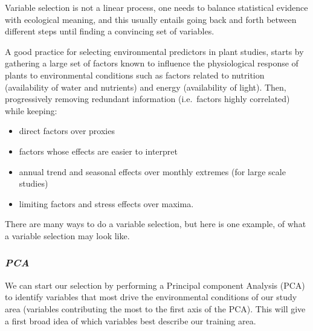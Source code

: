 \documentclass[
]{article}
\begin{document}
Variable selection is not a linear process, one needs to balance
statistical evidence with ecological meaning, and this usually entails
going back and forth between different steps until finding a convincing
set of variables.

\begin{infobox}

A good practice for selecting environmental predictors in plant studies,
starts by gathering a large set of factors known to influence the
physiological response of plants to environmental conditions such as
factors related to nutrition (availability of water and nutrients) and
energy (availability of light). Then, progressively removing redundant
information (i.e.~factors highly correlated) while keeping:

\begin{itemize}
\item
  direct factors over proxies
\item
  factors whose effects are easier to interpret
\item
  annual trend and seasonal effects over monthly extremes (for large
  scale studies)
\item
  limiting factors and stress effects over maxima.
\end{itemize}

\end{infobox}

There are many ways to do a variable selection, but here is one example,
of what a variable selection may look like.

\hypertarget{pca}{%
\subsubsection{\texorpdfstring{\emph{PCA}}{PCA}}\label{pca}}

We can start our selection by performing a Principal component Analysis
(PCA) to identify variables that most drive the environmental conditions
of our study area (variables contributing the most to the first axis of
the PCA). This will give a first broad idea of which variables best
describe our training area.
\end{document}

